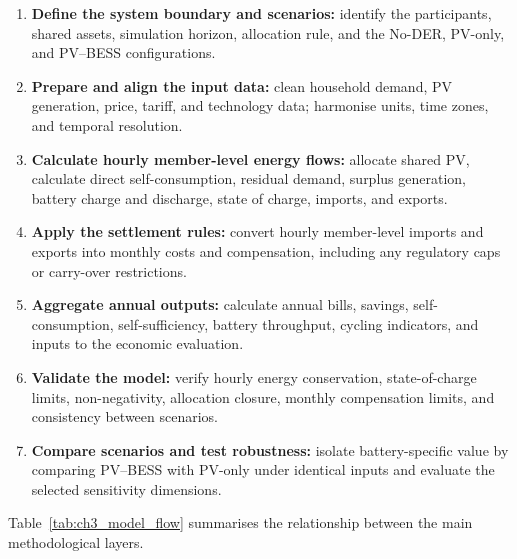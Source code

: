 \begin{enumerate}
    \item \textbf{Define the system boundary and scenarios:} identify the participants, shared assets, simulation horizon, allocation rule, and the No-DER, PV-only, and PV--BESS configurations.
    \item \textbf{Prepare and align the input data:} clean household demand, PV generation, price, tariff, and technology data; harmonise units, time zones, and temporal resolution.
    \item \textbf{Calculate hourly member-level energy flows:} allocate shared PV, calculate direct self-consumption, residual demand, surplus generation, battery charge and discharge, state of charge, imports, and exports.
    \item \textbf{Apply the settlement rules:} convert hourly member-level imports and exports into monthly costs and compensation, including any regulatory caps or carry-over restrictions.
    \item \textbf{Aggregate annual outputs:} calculate annual bills, savings, self-consumption, self-sufficiency, battery throughput, cycling indicators, and inputs to the economic evaluation.
    \item \textbf{Validate the model:} verify hourly energy conservation, state-of-charge limits, non-negativity, allocation closure, monthly compensation limits, and consistency between scenarios.
    \item \textbf{Compare scenarios and test robustness:} isolate battery-specific value by comparing PV--BESS with PV-only under identical inputs and evaluate the selected sensitivity dimensions.
\end{enumerate}

Table~\ref{tab:ch3_model_flow} summarises the relationship between the main methodological layers.

